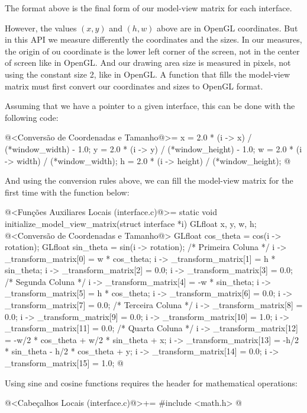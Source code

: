 The format above is the final form of our model-view matrix for each
interface.

However, the values $(x, y)$ and $(h, w)$ above are in OpenGL
coordinates. But in this API we measure differently the coordinates
and the sizes. In our measures, the origin of ou coordinate is the
lower left corner of the screen, not in the center of screen like in
OpenGL. And our drawing area size is measured in pixels, not using the
constant size 2, like in OpenGL. A function that fills the model-view
matrix must first convert our coordinates and sizes to OpenGL format.

Assuming that we have a pointer  to a given interface, this can be done with the following code:

\iniciocodigo
@<Conversão de Coordenadas e Tamanho@>=
x = 2.0 * (i -> x) / (*window_width) - 1.0;
y = 2.0 * (i -> y) / (*window_height) - 1.0;
w = 2.0 * (i -> width) / (*window_width);
h = 2.0 * (i -> height) / (*window_height);
@
\fimcodigo

And using the conversion rules above, we can fill the model-view
matrix for the first time with the function below:

\iniciocodigo
@<Funções Auxiliares Locais (interface.c)@>=
static void initialize_model_view_matrix(struct interface *i){
  GLfloat x, y, w, h;
  @<Conversão de Coordenadas e Tamanho@>
  GLfloat cos_theta = cos(i -> rotation);
  GLfloat sin_theta = sin(i -> rotation);
  /* Primeira Coluna */
  i -> _transform_matrix[0] = w * cos_theta;
  i -> _transform_matrix[1] = h * sin_theta;
  i -> _transform_matrix[2] = 0.0;
  i -> _transform_matrix[3] = 0.0;
  /* Segunda Coluna */
  i -> _transform_matrix[4] = -w * sin_theta;
  i -> _transform_matrix[5] = h * cos_theta;
  i -> _transform_matrix[6] = 0.0;
  i -> _transform_matrix[7] = 0.0;
  /* Terceira Coluna */
  i -> _transform_matrix[8] = 0.0;
  i -> _transform_matrix[9] = 0.0;
  i -> _transform_matrix[10] = 1.0;
  i -> _transform_matrix[11] = 0.0;
  /* Quarta Coluna */
  i -> _transform_matrix[12] = -w/2 * cos_theta + w/2 * sin_theta + x;
  i -> _transform_matrix[13] = -h/2 * sin_theta - h/2 * cos_theta + y;
  i -> _transform_matrix[14] = 0.0;
  i -> _transform_matrix[15] = 1.0;
}
@
\fimcodigo

Using sine and cosine functions requires the header for mathematical
operations:

\iniciocodigo
@<Cabeçalhos Locais (interface.c)@>+=
#include <math.h>
@
\fimcodigo


